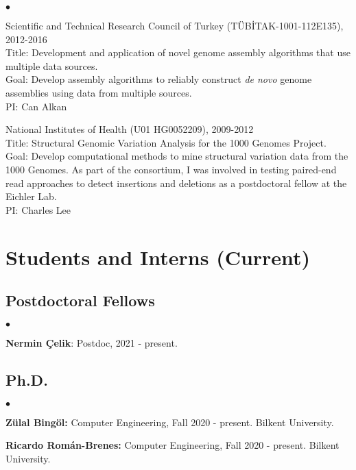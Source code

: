 \documentclass[margin,line]{res}
\newenvironment{list2}{
  \begin{list}{$\bullet$}{%
      \setlength{\itemsep}{0.1cm}
      \setlength{\parsep}{0in} \setlength{\parskip}{0in}
      \setlength{\topsep}{0in} \setlength{\partopsep}{0in} 
      \setlength{\leftmargin}{0.2in}}}{\end{list}}
\begin{document}
\begin{resume}
\begin{list2}
                                       \item
                                         Scientific and Technical Research Council of Turkey (T\"{U}B\.{I}TAK-1001-112E135), 2012-2016\\
                                         Title: Development and application of novel genome assembly algorithms that use multiple data sources.\\
                                         Goal: Develop assembly algorithms to reliably construct \textit{de novo} genome assemblies using data from multiple sources.\\
                                         PI: Can Alkan
                                       \item
                                         National Institutes of Health (U01 HG0052209), 2009-2012\\
                                         Title: Structural Genomic Variation Analysis for the 1000 Genomes Project.\\
                                         Goal: Develop computational methods to mine structural variation data from the 1000 Genomes.
                                         As part of the consortium, I was involved in testing paired-end read approaches to detect insertions and deletions as a postdoctoral fellow at the Eichler Lab.\\
                                         PI: Charles Lee
                                       \end{list2}


\section{\sc Students and Interns (Current)}
\vspace*{-.4cm}
\subsection{\small \sc Postdoctoral Fellows}
\begin{list2}
\item 
{\bf Nermin Çelik}: Postdoc, 2021 - present.
\end{list2}
\vspace*{-.4cm}
\subsection{\small \sc Ph.D.}
\begin{list2}
  \item
  {\bf Zülal Bingöl:} Computer Engineering, Fall 2020 - present. Bilkent University. 
  \item
  {\bf Ricardo Román-Brenes:} Computer Engineering, Fall 2020 - present. Bilkent University. 
\end{list2}


\end{resume}
\end{document}

